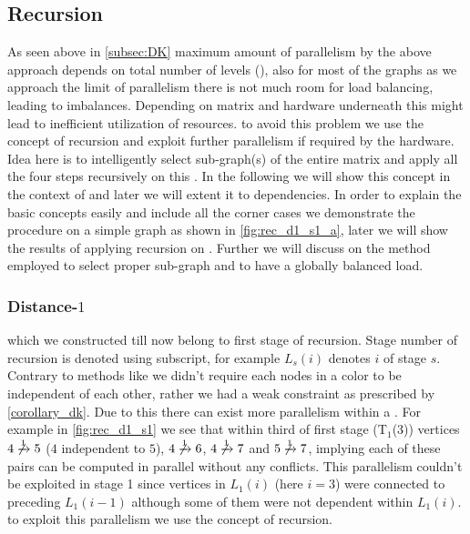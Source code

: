 	\subsection{Recursion}\label{subsec:REC}
	As seen above in \cref{subsec:DK} maximum amount of parallelism by the above approach depends on total number of levels (\totalLvl), also for most of the graphs as we approach the limit of parallelism there is not much room for load balancing, leading to imbalances. Depending on matrix and hardware underneath this might lead to inefficient utilization of resources. \Inorder to avoid this problem we use the concept of recursion and exploit further parallelism if required by the hardware. Idea here is to intelligently select sub-graph(s) of the entire matrix and apply all the four steps recursively on this \subgraph. In the following we will show this concept in the context of \DONE and  later we will extent it to \DK dependencies. In order to explain the basic concepts easily and include all the corner cases we demonstrate the procedure on a simple graph as shown in \cref{fig:rec_d1_s1_a}, later we will show the results of applying recursion on \stex. Further we will discuss on the method employed to select proper sub-graph and to have a globally balanced load.
	
	\subsubsection{Distance-$1$}
	\LevelGroups which we constructed till now belong to first stage of recursion. Stage number of recursion is denoted using subscript, \ie for example $L_s(i)$ denotes \level $i$ of stage $s$. Contrary to methods like \MCfull we didn't require each nodes in a color to be \DONE independent of each other, rather we had a weak constraint as prescribed by \cref{corollary_dk}. Due to this there can exist more parallelism within a \levelGroup. For example in \cref{fig:rec_d1_s1} we see that within third \levelGroup of first stage (T$_1$(3)) vertices $4 \not\xrightarrow{1} 5$ ($4$  \DONE independent to $5$), $4 \not\xrightarrow{1} 6$, $4 \not\xrightarrow{1} 7$ and $5 \not\xrightarrow{1} 7$, implying each of these pairs can be computed in parallel without any \DONE conflicts. This parallelism couldn't be exploited in stage 1 since vertices in $L_1(i)$ (here $i=3$) were connected to preceding \level $L_1(i-1)$ although some of them were not \DONE dependent within $L_1(i)$. \Inorder to exploit this parallelism we use the concept of recursion.
	
